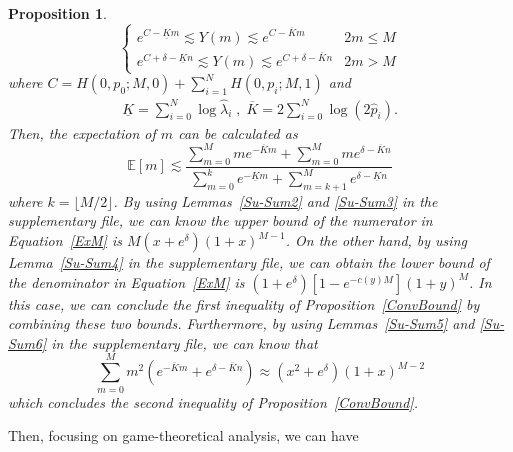 \documentclass{article}
\makeatletter
\newtheorem{proposition}[theorem]{Proposition}
\renewenvironment{proof}[1][\proofname]{\par
  \vspace{-\topsep}%
  \pushQED{\qed}%
  \normalfont
  \topsep0pt \partopsep0pt %
  \trivlist
  \item[\hskip\labelsep
        \itshape
    #1\@addpunct{.}]\ignorespaces
}{%
  \popQED\endtrivlist\@endpefalse
  \addvspace{0pt plus 0pt} %
}
\makeatother
\begin{document}
\begin{proposition}
\begin{proof}
\begin{equation}
\left\{
\begin{array}{lc}
e^{C-\underline{K}m}\lesssim Y(m) \lesssim e^{C-\overline{K}m} & 2m\leq M\\
e^{C+\delta-\underline{K}n}\lesssim Y(m) \lesssim e^{C+\delta-\overline{K}n} & 2m>M
\end{array}
\right.
\end{equation}
where $C=H(0,p_0;M,0)+\sum_{i=1}^{N}H(0,p_i;M,1)$ and
\begin{equation*}
\begin{split}
\underline{K} = {\sum}_{i=0}^{N}\log \hat{\lambda}_{i}\;,\; \overline{K} =  2{\sum}_{i=0}^{N}\log \left(2\hat{p}_i\right).
\end{split}
\end{equation*}
Then, the expectation of $m$ can be calculated as
\begin{equation}
\label{ExM}
\mathbb{E}[m] \lesssim \frac{\sum_{m=0}^{M}me^{-\overline{K}m}+\sum_{m=0}^{M}me^{\delta-\overline{K}n}}{\sum_{m=0}^{k}e^{-\underline{K}m}+\sum_{m=k+1}^{M}e^{\delta-\underline{K}n}}
\end{equation}
where $k=\lfloor M/2 \rfloor$. By using Lemmas~\ref{Su-Sum2} and \ref{Su-Sum3} in the supplementary file, we can know the upper bound of the numerator in Equation~\ref{ExM} is $M(x+e^{\delta})(1+x)^{M-1}$. On the other hand, by using Lemma~\ref{Su-Sum4} in the supplementary file, we can obtain the lower bound of the denominator in Equation~\ref{ExM} is $(1+e^{\delta})[1-e^{-c(y)M}](1+y)^{M}$. In this case, we can conclude the first inequality of Proposition~\ref{ConvBound} by combining these two bounds. Furthermore, by using Lemmas~\ref{Su-Sum5} and \ref{Su-Sum6} in the supplementary file, we can know that
\begin{equation}
\sum_{m=0}^{M}m^2(e^{-\overline{K}m}+e^{\delta-\overline{K}n})\approx (x^2+e^{\delta})(1+x)^{M-2}
\end{equation}
which concludes the second inequality of Proposition~\ref{ConvBound}.
\end{proof}
\end{proposition}
Then, focusing on game-theoretical analysis, we can have
\end{document}
